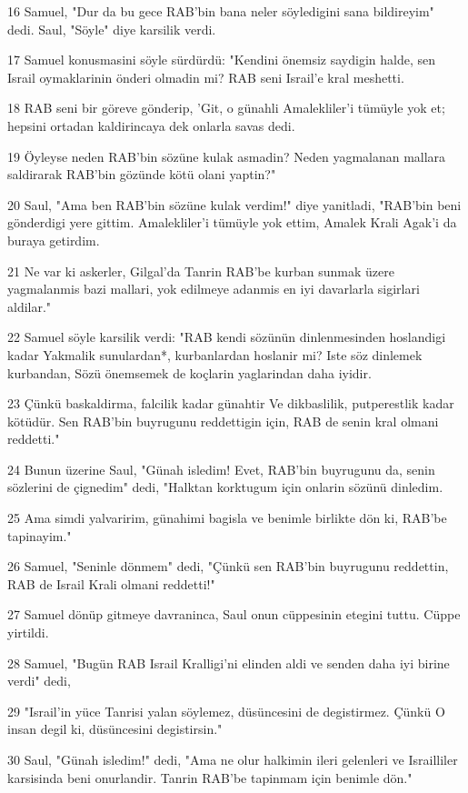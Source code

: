 \par 16 Samuel, "Dur da bu gece RAB'bin bana neler söyledigini sana bildireyim" dedi. Saul, "Söyle" diye karsilik verdi.
\par 17 Samuel konusmasini söyle sürdürdü: "Kendini önemsiz saydigin halde, sen Israil oymaklarinin önderi olmadin mi? RAB seni Israil'e kral meshetti.
\par 18 RAB seni bir göreve gönderip, 'Git, o günahli Amalekliler'i tümüyle yok et; hepsini ortadan kaldirincaya dek onlarla savas dedi.
\par 19 Öyleyse neden RAB'bin sözüne kulak asmadin? Neden yagmalanan mallara saldirarak RAB'bin gözünde kötü olani yaptin?"
\par 20 Saul, "Ama ben RAB'bin sözüne kulak verdim!" diye yanitladi, "RAB'bin beni gönderdigi yere gittim. Amalekliler'i tümüyle yok ettim, Amalek Krali Agak'i da buraya getirdim.
\par 21 Ne var ki askerler, Gilgal'da Tanrin RAB'be kurban sunmak üzere yagmalanmis bazi mallari, yok edilmeye adanmis en iyi davarlarla sigirlari aldilar."
\par 22 Samuel söyle karsilik verdi: "RAB kendi sözünün dinlenmesinden hoslandigi kadar Yakmalik sunulardan*, kurbanlardan hoslanir mi? Iste söz dinlemek kurbandan, Sözü önemsemek de koçlarin yaglarindan daha iyidir.
\par 23 Çünkü baskaldirma, falcilik kadar günahtir Ve dikbaslilik, putperestlik kadar kötüdür. Sen RAB'bin buyrugunu reddettigin için, RAB de senin kral olmani reddetti."
\par 24 Bunun üzerine Saul, "Günah isledim! Evet, RAB'bin buyrugunu da, senin sözlerini de çignedim" dedi, "Halktan korktugum için onlarin sözünü dinledim.
\par 25 Ama simdi yalvaririm, günahimi bagisla ve benimle birlikte dön ki, RAB'be tapinayim."
\par 26 Samuel, "Seninle dönmem" dedi, "Çünkü sen RAB'bin buyrugunu reddettin, RAB de Israil Krali olmani reddetti!"
\par 27 Samuel dönüp gitmeye davraninca, Saul onun cüppesinin etegini tuttu. Cüppe yirtildi.
\par 28 Samuel, "Bugün RAB Israil Kralligi'ni elinden aldi ve senden daha iyi birine verdi" dedi,
\par 29 "Israil'in yüce Tanrisi yalan söylemez, düsüncesini de degistirmez. Çünkü O insan degil ki, düsüncesini degistirsin."
\par 30 Saul, "Günah isledim!" dedi, "Ama ne olur halkimin ileri gelenleri ve Israilliler karsisinda beni onurlandir. Tanrin RAB'be tapinmam için benimle dön."
